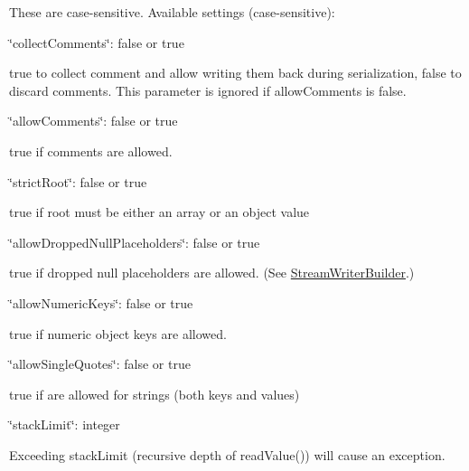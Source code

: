 These are case-\/sensitive. Available settings (case-\/sensitive)\+:
\begin{DoxyItemize}
\item {\ttfamily \char`\"{}collect\+Comments\char`\"{}\+: false or true}
\begin{DoxyItemize}
\item true to collect comment and allow writing them back during serialization, false to discard comments. This parameter is ignored if allow\+Comments is false.
\end{DoxyItemize}
\item {\ttfamily \char`\"{}allow\+Comments\char`\"{}\+: false or true}
\begin{DoxyItemize}
\item true if comments are allowed.
\end{DoxyItemize}
\item {\ttfamily \char`\"{}strict\+Root\char`\"{}\+: false or true}
\begin{DoxyItemize}
\item true if root must be either an array or an object value
\end{DoxyItemize}
\item {\ttfamily \char`\"{}allow\+Dropped\+Null\+Placeholders\char`\"{}\+: false or true}
\begin{DoxyItemize}
\item true if dropped null placeholders are allowed. (See \hyperlink{classJson_1_1StreamWriterBuilder}{Stream\+Writer\+Builder}.)
\end{DoxyItemize}
\item {\ttfamily \char`\"{}allow\+Numeric\+Keys\char`\"{}\+: false or true}
\begin{DoxyItemize}
\item true if numeric object keys are allowed.
\end{DoxyItemize}
\item {\ttfamily \char`\"{}allow\+Single\+Quotes\char`\"{}\+: false or true}
\begin{DoxyItemize}
\item true if \textquotesingle{}\textquotesingle{} are allowed for strings (both keys and values)
\end{DoxyItemize}
\item {\ttfamily \char`\"{}stack\+Limit\char`\"{}\+: integer}
\begin{DoxyItemize}
\item Exceeding stack\+Limit (recursive depth of {\ttfamily read\+Value()}) will cause an exception.

\end{DoxyItemize}
\end{DoxyItemize}
